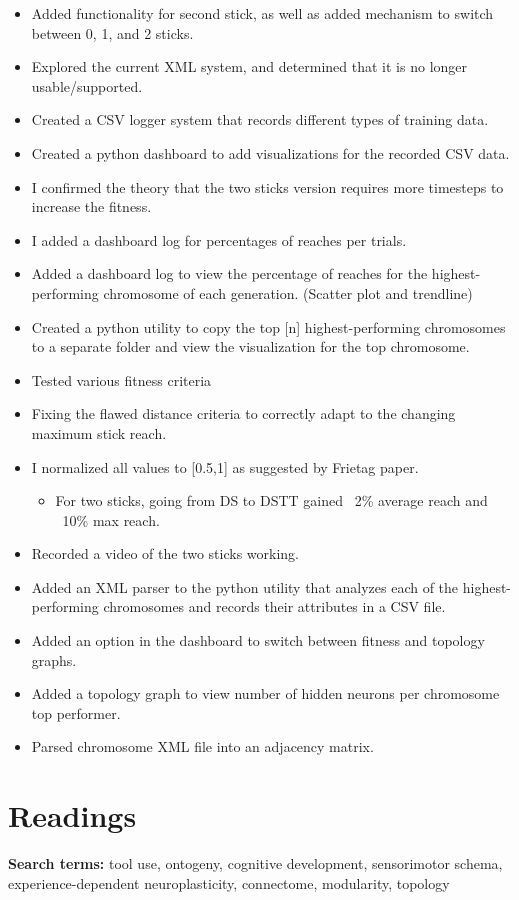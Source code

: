 \documentclass{article}
\begin{document}
\begin{itemize}
    \item Added functionality for second stick, as well as added mechanism to switch between 0, 1, and 2 sticks.
    \item Explored the current XML system, and determined that it is no longer usable/supported. 
    \item Created a CSV logger system that records different types of training data.
    \item Created a python dashboard to add visualizations for the recorded CSV data.
    \item I confirmed the theory that the two sticks version requires more timesteps to increase the fitness.
    \item I added a dashboard log for percentages of reaches per trials.
        \item Added a dashboard log to view the percentage of reaches for the highest-performing chromosome of each generation. (Scatter plot and trendline) 
    \item Created a python utility to copy the top [n] highest-performing chromosomes to a separate folder and view the visualization for the top chromosome.
    \item Tested various fitness criteria 
        \item Fixing the flawed distance criteria to correctly adapt to the changing maximum stick reach.
        \item I normalized all values to [0.5,1] as suggested by Frietag paper.
        \begin{itemize}
            \item For two sticks, going from DS to DSTT gained ~2\% average reach and ~10\% max reach. 
        \end{itemize}
    \item Recorded a video of the two sticks working.
    \item Added an XML parser to the python utility that analyzes each of the highest-performing chromosomes and records their attributes in a CSV file. 
    \item Added an option in the dashboard to switch between fitness and topology graphs.
    \item Added a topology graph to view number of hidden neurons per chromosome top performer.
    \item Parsed chromosome XML file into an adjacency matrix.
\end{itemize}

\section{Readings}
\textbf{Search terms:} tool use, ontogeny, cognitive development, sensorimotor schema, experience-dependent neuroplasticity, connectome, modularity, topology
\end{document}
